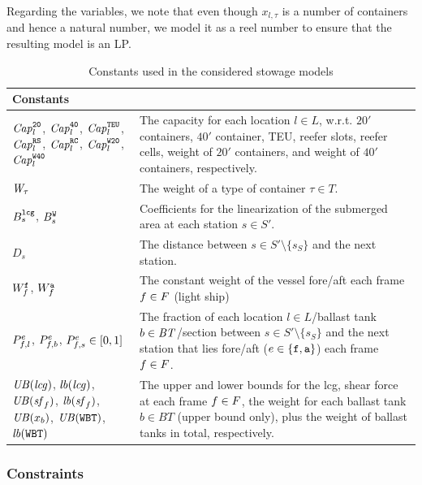 Regarding the variables, we note that even though $x_{l,\tau}$ is a number of containers and hence a natural number, we model it as a reel number to ensure that the resulting model is an LP.  
%
\begin{table}[p]
\centering
\begin{tabular}{p{4.5cm}p{8cm}}%
\multicolumn{2}{l}{\textbf{Constants}}\\
\hline\noalign{\smallskip}
$\mathit{Cap}_l^{\texttt{20}}$, $\mathit{Cap}_l^{\texttt{40}}$, $\mathit{Cap}_l^{\texttt{TEU}}$, $\mathit{Cap}_l^{\texttt{RS}}$, $\mathit{Cap}_l^{\texttt{RC}}$, 
$\mathit{Cap}_l^{\texttt{W20}}$, $\mathit{Cap}_l^{\texttt{W40}}$
		& The capacity for each location $l\in L$, w.r.t. $20'$ containers, $40'$ container, TEU, reefer slots, reefer cells, weight of $20'$ containers, and weight of $40'$ containers, respectively.\\
$\mathit{W}_\tau$
		&The weight of a type of container $\tau\in T$.\\
$B^{\texttt{lcg}}_s$, $B^{\texttt{W}}_s$
		&{Coefficients for the linearization of the submerged area at each station $s\in S'$.}\\
$D_s$ &
		The distance between $s\in S'\setminus\{s_S\}$ and the next station.\\
$W^{\texttt{f}}_f$, $W^{\texttt{a}}_f$
		&{The constant weight of the vessel fore/aft each frame $f\in F$ (light ship)}\\
$P^{e}_{f,l}$, $P^{e}_{f,b}$, $P^{e}_{f,s}\in [0,1]$
		& The fraction of each location $l\in L$/ballast tank $b\in \mathit{BT}$/section between $s\in S'\setminus\{s_S\}$ and the next station that lies fore/aft (${e}\in\{\texttt{f},\texttt{a}\}$) each frame $f\in F$.\\
$\mathit{UB}(\mathit{lcg})$, $\mathit{lb}(\mathit{lcg})$,\newline $\mathit{UB}(\mathit{sf}_f)$, $\mathit{lb}(\mathit{sf}_f)$,\newline 
 $\mathit{UB}(x_b)$, $\mathit{UB}(\texttt{WBT})$,\newline $\mathit{lb}(\texttt{WBT})$
		&The upper and lower bounds for the lcg, shear force at each frame $f\in F$, the weight for each ballast tank $b\in BT$ (upper bound only), plus 
		the weight of ballast tanks in total, respectively.\\
\end{tabular}
\caption{Constants used in the considered stowage models}\label{table:constants}
\end{table}
%
\subsubsection*{Constraints}

